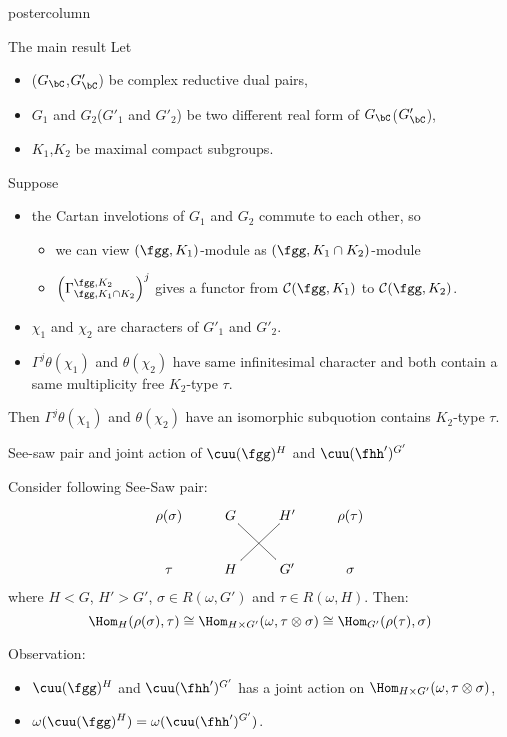 \documentclass[final,hyperref={pdfpagelabels=false}]{beamer} %
\def\cC{\mathcal{C}}
\begin{document}
\begin{frame}
\begin{columns}
\begin{column}{.49\textwidth}
\begin{beamercolorbox}[center,wd=\textwidth]{postercolumn}
\begin{minipage}[T]{.95\textwidth}
{  
    \begin{block}{The main result}
      Let
      \begin{itemize}
      \item ($G_\bC$,$G'_\bC$) be complex reductive dual pairs,
      \item $G_1$ and $G_2$($G'_1$ and $G'_2$) 
        be two different real form of $G_\bC$($G'_\bC$),
     \item $K_1$,$K_2$ be maximal compact subgroups.
     \end{itemize}
     Suppose
     \begin{itemize}
     \item the Cartan invelotions of $G_1$ and $G_2$ commute to each other, so
        \begin{itemize}
        \item we can view $(\fgg, K_1)$-module as $(\fgg, K_1\cap K_2)$-module
        \item $\left(\Gamma_{\fgg,K_1\cap K_2}^{\fgg,K_2}\right)^j$ gives a functor 
          from $\cC(\fgg, K_1)$ to $\cC(\fgg,K_2)$.
        \end{itemize}
      \item $\chi_1$ and $\chi_2$ are characters of $G'_1$ and $G'_2$.
      \item $\Gamma^j\theta(\chi_1)$ and  $\theta(\chi_2)$ 
        have same infinitesimal character
        and both contain a same multiplicity free $K_2$-type $\tau$.
      \end{itemize}
      Then 
      $\Gamma^j\theta(\chi_1)$ and $\theta(\chi_2)$ 
      have an isomorphic subquotion contains  $K_2$-type $\tau$.
    \end{block}
    
    \begin{block}{See-saw pair and  joint action of $\cuu(\fgg)^H$ 
and $\cuu(\fhh')^{G'}$}

Consider following See-Saw pair:
\[
\xymatrix{
\rho(\sigma)& G \ar@{-}[dr] & H'& \rho(\tau)\\
\tau &H\ar@{-}[ur] & G' & \sigma
}
\]
where $H < G$, $H'> G'$, $\sigma\in R(\omega, G')$ and  $\tau\in R(\omega,H)$.
Then:
\[
\Hom_{H}(\rho(\sigma), \tau) 
\cong  \Hom_{H\times G'}(\omega, \tau\otimes \sigma)
\cong  \Hom_{G'}(\rho(\tau), \sigma)
\]

Observation:
\begin{itemize}
\item $\cuu(\fgg)^H$ and $\cuu(\fhh')^{G'}$ 
  has a joint action on $\Hom_{H\times G'}(\omega,\tau\otimes\sigma)$,
\item $\displaystyle \omega(\cuu(\fgg)^H) = \omega(\cuu(\fhh')^{G'})$.
\end{itemize}


\end{block}}
\end{minipage}
\end{beamercolorbox}
\end{column}
\end{columns}
\end{frame}
\end{document}
